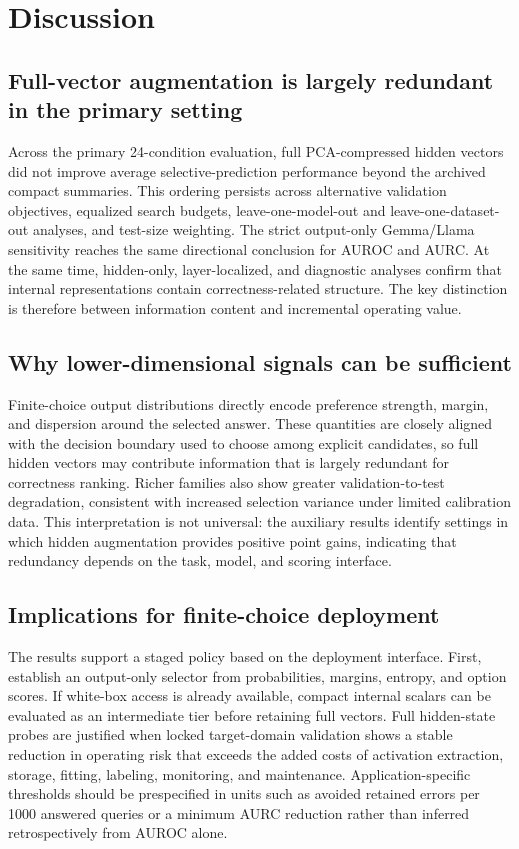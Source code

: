 \documentclass[preprint,12pt,authoryear]{elsarticle}
\begin{document}

\FloatBarrier

\section{Discussion}
\subsection{Full-vector augmentation is largely redundant in the primary setting}
Across the primary 24-condition evaluation, full PCA-compressed hidden vectors did not improve average selective-prediction performance beyond the archived compact summaries. This ordering persists across alternative validation objectives, equalized search budgets, leave-one-model-out and leave-one-dataset-out analyses, and test-size weighting. The strict output-only Gemma/Llama sensitivity reaches the same directional conclusion for AUROC and AURC. At the same time, hidden-only, layer-localized, and diagnostic analyses confirm that internal representations contain correctness-related structure. The key distinction is therefore between information content and incremental operating value.

\subsection{Why lower-dimensional signals can be sufficient}
Finite-choice output distributions directly encode preference strength, margin, and dispersion around the selected answer. These quantities are closely aligned with the decision boundary used to choose among explicit candidates, so full hidden vectors may contribute information that is largely redundant for correctness ranking. Richer families also show greater validation-to-test degradation, consistent with increased selection variance under limited calibration data. This interpretation is not universal: the auxiliary results identify settings in which hidden augmentation provides positive point gains, indicating that redundancy depends on the task, model, and scoring interface.

\subsection{Implications for finite-choice deployment}
The results support a staged policy based on the deployment interface. First, establish an output-only selector from probabilities, margins, entropy, and option scores. If white-box access is already available, compact internal scalars can be evaluated as an intermediate tier before retaining full vectors. Full hidden-state probes are justified when locked target-domain validation shows a stable reduction in operating risk that exceeds the added costs of activation extraction, storage, fitting, labeling, monitoring, and maintenance. Application-specific thresholds should be prespecified in units such as avoided retained errors per 1000 answered queries or a minimum AURC reduction rather than inferred retrospectively from AUROC alone.
\end{document}

